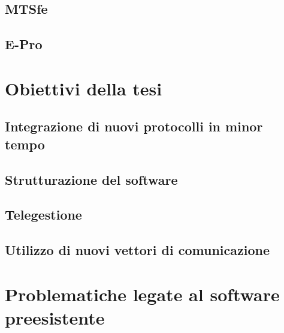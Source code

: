 \subsection{MTSfe}
\subsection{E-Pro}
\section{Obiettivi della tesi}
\subsection{Integrazione di nuovi protocolli in minor tempo}
\subsection{Strutturazione del software}
\subsection{Telegestione}
\subsection{Utilizzo di nuovi vettori di comunicazione}
\section{Problematiche legate al software preesistente}


